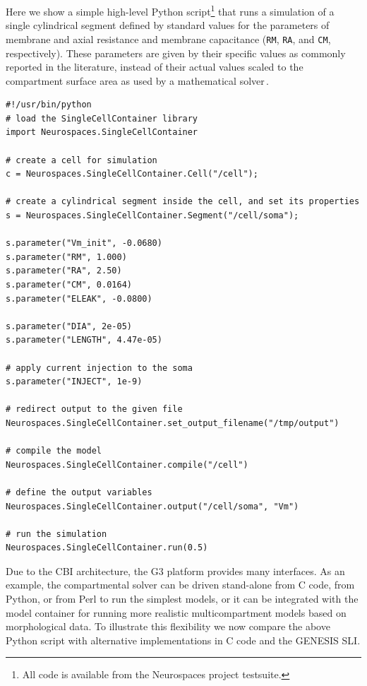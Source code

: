 \documentclass[12pt]{article}
\begin{document}
Here we show a simple high-level Python script\footnote{All code is
  available from the Neurospaces project testsuite.} that runs a
simulation of a single cylindrical segment defined by standard values
for the parameters of membrane and axial resistance and membrane
capacitance ({\tt RM}, {\tt RA},
and {\tt CM}, respectively).  These parameters are given by their
specific values as commonly reported in the literature, instead of
their actual values scaled to the compartment surface area as used by
a mathematical solver\,\cite{cornelis04:_neuros_param_handl}.

{\vspace*{1mm}
 { \footnotesize
  \linenumbers
  {\begin{verbatim}
#!/usr/bin/python
# load the SingleCellContainer library
import Neurospaces.SingleCellContainer

# create a cell for simulation
c = Neurospaces.SingleCellContainer.Cell("/cell");

# create a cylindrical segment inside the cell, and set its properties
s = Neurospaces.SingleCellContainer.Segment("/cell/soma");

s.parameter("Vm_init", -0.0680)
s.parameter("RM", 1.000)
s.parameter("RA", 2.50)
s.parameter("CM", 0.0164)
s.parameter("ELEAK", -0.0800)

s.parameter("DIA", 2e-05)
s.parameter("LENGTH", 4.47e-05)

# apply current injection to the soma
s.parameter("INJECT", 1e-9)

# redirect output to the given file
Neurospaces.SingleCellContainer.set_output_filename("/tmp/output")

# compile the model
Neurospaces.SingleCellContainer.compile("/cell")

# define the output variables
Neurospaces.SingleCellContainer.output("/cell/soma", "Vm")
    
# run the simulation
Neurospaces.SingleCellContainer.run(0.5)
\end{verbatim}
  \vspace*{1mm} }}}

Due to the CBI architecture, the G3 platform provides many interfaces.
As an example, the compartmental solver can be driven stand-alone from
C code, from Python, or from Perl to run the simplest models, or it
can be integrated with the model container for running more realistic
multicompartment models based on morphological data.  To illustrate
this flexibility we now compare the above Python script with
alternative implementations in C code and the GENESIS SLI.
\end{document}
